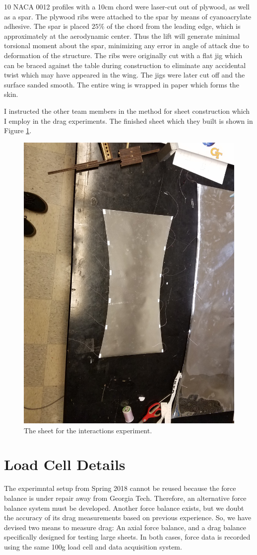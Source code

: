 \documentclass[12pt]{report} %
\begin{document}
10 NACA 0012 profiles with a 10cm chord were laser-cut out of plywood, as well as a spar. The plywood ribs were attached to the spar
by means of cyanoacrylate
adhesive. The spar is placed $25\%$ of the chord from the leading edge, which is approximately at the aerodynamic center. Thus the lift will
generate minimal torsional moment about the spar, minimizing any error in angle of attack due to deformation of the structure.
The ribs were originally cut with a flat jig which can be braced against the table during construction to eliminate any accidental twist
which may have appeared in the wing. The jigs were later cut off and the surface sanded smooth. The entire wing is wrapped in paper which
forms the skin.

I instructed the other team members in the method for sheet construction which I employ in the drag experiments. The finished sheet which
they built is shown in Figure \ref{secondIterationSheet}.

\begin{figure}
\includegraphics[width = 0.7\linewidth]{secondIterationSheet.jpg}
\centering
\caption{The sheet for the interactions experiment.}
\label{secondIterationSheet}
\end{figure}

\section{Load Cell Details}
The experimntal setup from Spring 2018 cannot be reused because the force balance is under repair away from Georgia Tech. Therefore, an alternative
force balance system must be developed. Another force balance exists, but we doubt the accuracy of its drag measurements based on previous experience.
So, we have devised two means to measure drag: An axial force balance, and a drag balance specifically designed for testing large sheets. In both
cases, force data is recorded using the same 100g load cell and data acquisition system.
\end{document}
